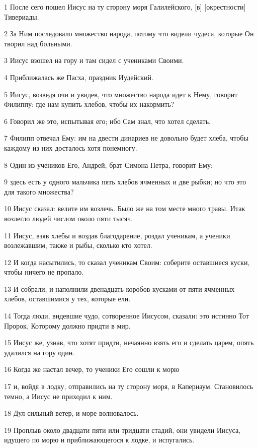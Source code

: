 \par 1 После сего пошел Иисус на ту сторону моря Галилейского, [в] [окрестности] Тивериады.
\par 2 За Ним последовало множество народа, потому что видели чудеса, которые Он творил над больными.
\par 3 Иисус взошел на гору и там сидел с учениками Своими.
\par 4 Приближалась же Пасха, праздник Иудейский.
\par 5 Иисус, возведя очи и увидев, что множество народа идет к Нему, говорит Филиппу: где нам купить хлебов, чтобы их накормить?
\par 6 Говорил же это, испытывая его; ибо Сам знал, что хотел сделать.
\par 7 Филипп отвечал Ему: им на двести динариев не довольно будет хлеба, чтобы каждому из них досталось хотя понемногу.
\par 8 Один из учеников Его, Андрей, брат Симона Петра, говорит Ему:
\par 9 здесь есть у одного мальчика пять хлебов ячменных и две рыбки; но что это для такого множества?
\par 10 Иисус сказал: велите им возлечь. Было же на том месте много травы. Итак возлегло людей числом около пяти тысяч.
\par 11 Иисус, взяв хлебы и воздав благодарение, роздал ученикам, а ученики возлежавшим, также и рыбы, сколько кто хотел.
\par 12 И когда насытились, то сказал ученикам Своим: соберите оставшиеся куски, чтобы ничего не пропало.
\par 13 И собрали, и наполнили двенадцать коробов кусками от пяти ячменных хлебов, оставшимися у тех, которые ели.
\par 14 Тогда люди, видевшие чудо, сотворенное Иисусом, сказали: это истинно Тот Пророк, Которому должно придти в мир.
\par 15 Иисус же, узнав, что хотят придти, нечаянно взять его и сделать царем, опять удалился на гору один.
\par 16 Когда же настал вечер, то ученики Его сошли к морю
\par 17 и, войдя в лодку, отправились на ту сторону моря, в Капернаум. Становилось темно, а Иисус не приходил к ним.
\par 18 Дул сильный ветер, и море волновалось.
\par 19 Проплыв около двадцати пяти или тридцати стадий, они увидели Иисуса, идущего по морю и приближающегося к лодке, и испугались.
